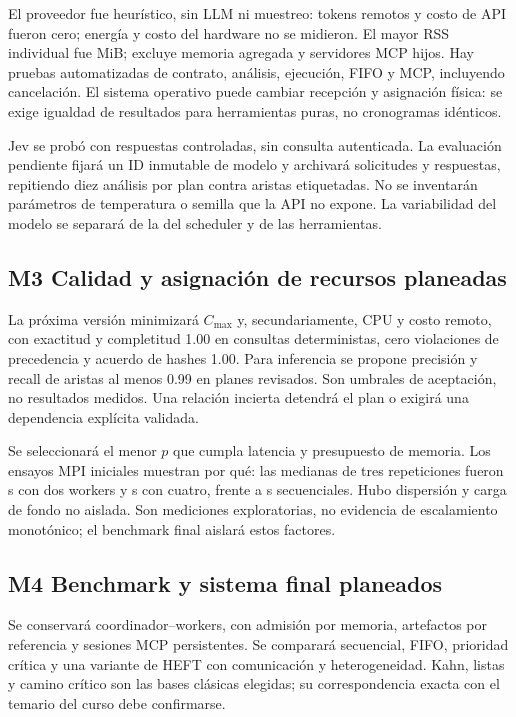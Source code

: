 El proveedor fue heurístico, sin LLM ni muestreo: tokens remotos
y costo de API fueron cero; energía y costo del hardware no se midieron.
El mayor RSS individual fue \MaxRss{} MiB; excluye memoria agregada
y servidores MCP hijos. Hay \TestCount{} pruebas automatizadas de
contrato, análisis, ejecución, FIFO y MCP, incluyendo cancelación.
El sistema operativo puede cambiar recepción y asignación física:
se exige igualdad de resultados para herramientas puras, no cronogramas
idénticos.

Jev se probó con respuestas controladas, sin consulta autenticada.
La evaluación pendiente fijará un ID inmutable de modelo y archivará
solicitudes y respuestas, repitiendo diez análisis por plan contra
aristas etiquetadas. No se inventarán parámetros de temperatura o semilla
que la API no expone. La variabilidad del modelo se separará de la
del scheduler y de las herramientas.

\subsection{M3 Calidad y asignación de recursos planeadas}
La próxima versión minimizará $C_{\max}$ y, secundariamente, CPU y
costo remoto, con exactitud y completitud 1.00 en consultas deterministas,
cero violaciones de precedencia y acuerdo de hashes 1.00.
Para inferencia se propone precisión y recall de aristas al menos 0.99
en planes revisados. Son umbrales de aceptación, no resultados medidos.
Una relación incierta detendrá el plan o exigirá una dependencia
explícita validada.

Se seleccionará el menor $p$ que cumpla latencia y presupuesto de
memoria. Los ensayos MPI iniciales muestran por qué: las medianas
de tres repeticiones fueron \MpiTwo{} s con dos workers y
\MpiFour{} s con cuatro, frente a \MpiSeq{} s secuenciales.
Hubo dispersión y carga de fondo no aislada. Son mediciones exploratorias,
no evidencia de escalamiento monotónico; el benchmark final aislará
estos factores.

\subsection{M4 Benchmark y sistema final planeados}
Se conservará coordinador--workers, con admisión por memoria,
artefactos por referencia y sesiones MCP persistentes. Se comparará
secuencial, FIFO, prioridad crítica y una variante de HEFT con
comunicación y heterogeneidad. Kahn, listas y camino crítico son
las bases clásicas elegidas; su correspondencia exacta con el temario
del curso debe confirmarse.


